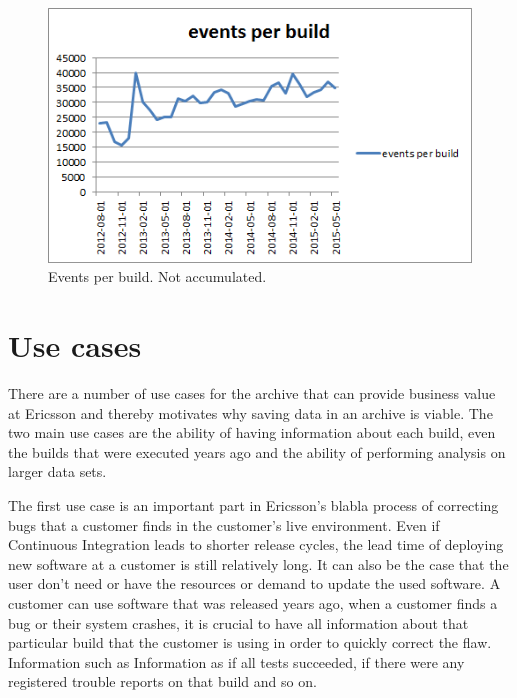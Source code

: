 \begin{figure}[h!]
\centering
\includegraphics[]{figure/events_per_build.png}
\caption{Events per build. Not accumulated.}
\label{fig:events_per_build}
\end{figure}


\section{Use cases}
\label{sec:usecases}

There are a number of use cases for the archive that can provide business value at Ericsson and thereby motivates why saving data in an archive is viable. The two main use cases are the ability of having information about each build, even the builds that were executed years ago and the ability of performing analysis on larger data sets. 

The first use case is an important part in Ericsson's blabla process of correcting bugs that a customer finds in the customer's live environment. Even if Continuous Integration leads to shorter release cycles, the lead time of deploying new software at a customer is still relatively long. It can also be the case that the user don't need or have the resources or demand to update the used software. A customer can use software that was released years ago, when a customer finds a bug or their system crashes, it is crucial to have all information about that particular build that the customer is using in order to quickly correct the flaw. Information such as  Information as if all tests succeeded, if there were any registered trouble reports on that build and so on. 

